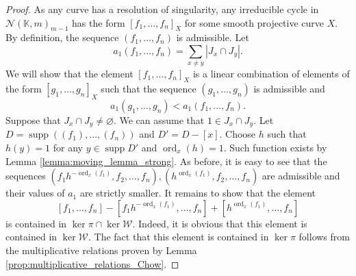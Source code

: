 \documentclass[12pt]{extarticle}
\def\mb{\mathbb}
\def\mc{\mathcal}
\def\k{\mb K}
\DeclareMathOperator{\ord}{ord}
\DeclareMathOperator{\supp}{supp}
\begin{document}
\begin{proof}
As any curve has a resolution of singularity, any irreducible cycle in $\mc N(\k,m)_{m-1}$ has the form $[f_1,\dots, f_n]_X$ for some smooth projective curve $X$. By definition, the sequence $(f_1,\dots, f_n)$ is admissible. Let
    $$a_1(f_1,\dots, f_n)=\sum\limits_{x\ne y} |J_{x}\cap J_y|.$$ We will show that the element $[f_1,\dots, f_n]_X$ is a linear combination of elements of the form $[g_1,\dots, g_n]_X$ such that the sequence $(g_1,\dots, g_n)$ is admissible and $$a_1(g_1,\dots, g_n)<a_1(f_1,\dots, f_n).$$ Suppose that $J_x\cap J_y\ne\varnothing$. We can assume that $1\in J_x\cap J_y$.
    Let $D=\supp((f_1),\dots, (f_n))$ and $D'=D-[x]$. Choose $h$ such that $h(y)=1$ for any $y\in \supp D'$ and $\ord_x(h)=1$. Such function exists by Lemma \ref{lemma:moving_lemma_strong}. As before, it is easy to see that the sequences $(f_1h^{-\ord_x(f_1)}, f_2,\dots, f_n), (h^{\ord_x(f_1)},f_2,\dots, f_n)$ are admissible and their values of $a_1$ are strictly smaller. It remains to show that the element $$[f_1,\dots,f_n]-[f_1h^{-\ord_x(f_1)}, \dots,f_n]+[h^{\ord_x(f_1)},\dots,f_n]$$
    is contained in $\ker\pi\cap\ker\mc W$.
    Indeed, it is obvious that this element is contained in $\ker\mc W$. The fact that this element is contained in $\ker \pi$ follows from the multiplicative relations proven by Lemma \ref{prop:multiplicative_relations_Chow}. 
\end{proof}
\end{document}
